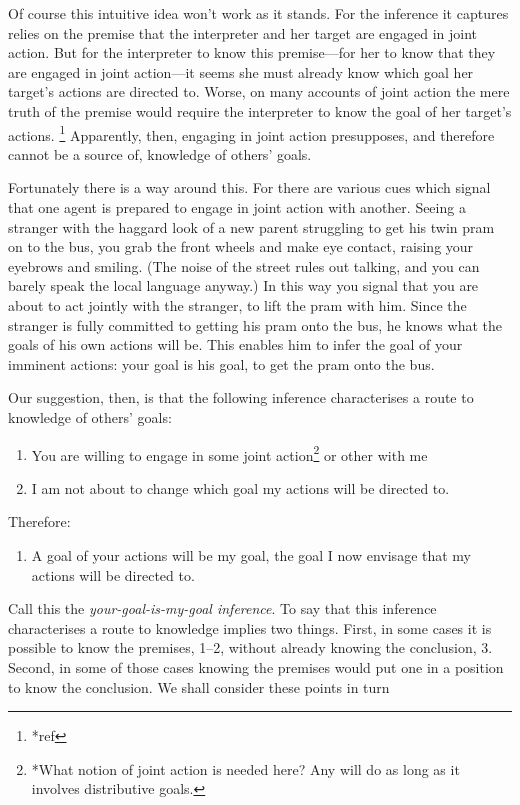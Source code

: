 \documentclass[14pt,a4paper]{extarticle}
\begin{document}
Of course this intuitive idea won't work as it stands.  
For the inference it captures relies on the premise that the interpreter and her target are engaged in joint action.
But for the interpreter to know this premise---for her to know that they are engaged in joint action---it seems she must   already know which goal her target's actions are directed to.
Worse,
on many accounts of joint action the mere truth of the premise  would require the interpreter to know the goal of her target's actions.%
\footnote{
*ref}
Apparently, then, engaging in joint action presupposes, and therefore cannot be a source of, knowledge of others' goals. 

Fortunately there is a way around this.  
For there are various cues which signal that one agent is prepared to engage in joint action with another.  
\label{twin_pram}
Seeing a stranger with the haggard look of a new parent struggling to get his twin pram on to the bus, you grab the front wheels and make eye contact, raising your eyebrows and smiling.
(The noise of the street rules out talking, 
and you can barely speak the local language anyway.)   
In this way you signal that you are about to act jointly with the stranger, to lift the pram with him.   
Since the stranger is fully committed to getting his pram onto the bus,
he knows what the goals of his own actions will be.
This enables him to infer the goal of your imminent actions: 
your goal is his goal, to get the pram onto the bus.

Our suggestion, then, is that the following inference characterises a route to knowledge of others’ goals:
%
\begin{enumerate}
\item You are willing to engage in some joint action\footnote{
*What notion of joint action is needed here?  Any will do as long as it involves distributive goals.
}
or other with me

\item I am not about to change which goal my actions will be directed to.

\end{enumerate}
%
Therefore:
%
\begin{enumerate}[resume]
%
\item A goal of your actions will be my goal, the goal I now envisage that my actions will be directed to.
\end{enumerate}
%
Call this the \emph{your-goal-is-my-goal inference}.  
To say that this inference characterises a route to knowledge implies two things.  
First, in some cases it is possible to know the premises, 1–2, without already knowing the conclusion, 3.  
Second, in some of those cases knowing the premises would put one in a position to know the conclusion.  
We shall consider these points in turn
\end{document}
